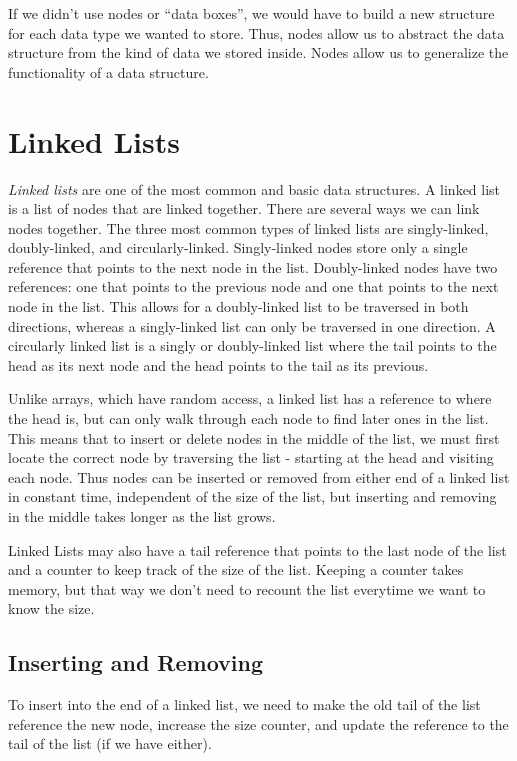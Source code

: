 If we didn't use nodes or ``data boxes'', we would have to build a new structure for each data type we wanted to store.
Thus, nodes allow us to abstract the data structure from the kind of data we stored inside.
Nodes allow us to generalize the functionality of a data structure.

\section*{Linked Lists}
\emph{Linked lists} are one of the most common and basic data structures.
A linked list is a list of nodes that are linked together.
There are several ways we can link nodes together.  
The three most common types of linked lists are singly-linked, doubly-linked, and circularly-linked.
Singly-linked nodes store only a single reference that points to the next node in the list.
Doubly-linked nodes have two references:
one that points to the previous node and one that points to the next node in the list.
This allows for a doubly-linked list to be traversed in both directions, whereas a singly-linked list can only be traversed in one direction.
A circularly linked list is a singly or doubly-linked list where the tail points to the head as its next node and the head points to the tail as its previous.


Unlike arrays, which have random access, a
linked list has a reference to where the head is, but can only walk through each node to find later ones in the list.
This means that to insert or delete nodes in the middle of the list, we must first locate the correct node by traversing the list - starting at the head and visiting each node.
Thus nodes can be inserted or removed from either end of a linked list in constant time, independent of the size of the list, but inserting and removing in the middle takes longer as the list grows.

Linked Lists may also have a tail reference that points to the last node of the list and a counter to keep track of the size of the list.
Keeping a counter takes memory, but that way we don't need to recount the list everytime we want to know the size.


\subsection*{Inserting and Removing}

To insert into the end of a linked list, we need to make the old tail of the list reference the new node, increase the size counter, and update the reference to the tail of the list (if we have either).

